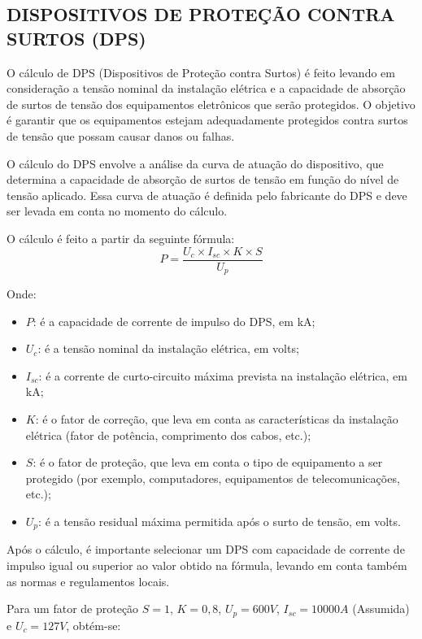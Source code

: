 \subsection{DISPOSITIVOS DE PROTEÇÃO CONTRA SURTOS (DPS)}

O cálculo de DPS (Dispositivos de Proteção contra Surtos) é feito levando em consideração a tensão nominal da instalação elétrica e a capacidade de absorção de surtos de tensão dos equipamentos eletrônicos que serão protegidos. O objetivo é garantir que os equipamentos estejam adequadamente protegidos contra surtos de tensão que possam causar danos ou falhas.

O cálculo do DPS envolve a análise da curva de atuação do dispositivo, que determina a capacidade de absorção de surtos de tensão em função do nível de tensão aplicado. Essa curva de atuação é definida pelo fabricante do DPS e deve ser levada em conta no momento do cálculo.

O cálculo é feito a partir da seguinte fórmula:
\begin{equation}
	P = \frac{U_c \times I_{sc} \times K \times S}{U_p}
\end{equation}

Onde:

\begin{itemize}
	\item $P$: é a capacidade de corrente de impulso do DPS, em kA;
	\item $U_c$: é a tensão nominal da instalação elétrica, em volts;
	\item $I_{sc}$: é a corrente de curto-circuito máxima prevista na instalação elétrica, em kA;
	\item $K$: é o fator de correção, que leva em conta as características da instalação elétrica (fator de potência, comprimento dos cabos, etc.);
	\item $S$: é o fator de proteção, que leva em conta o tipo de equipamento a ser protegido (por exemplo, computadores, equipamentos de telecomunicações, etc.);
	\item $U_p$: é a tensão residual máxima permitida após o surto de tensão, em volts.
	
\end{itemize}

Após o cálculo, é importante selecionar um DPS com capacidade de corrente de impulso igual ou superior ao valor obtido na fórmula, levando em conta também as normas e regulamentos locais.

Para um fator de proteção $S=1$, $K=0,8$, $U_p=600V$, $I_{sc}=10000A$ (Assumida) e $U_c=127V$, obtém-se:

